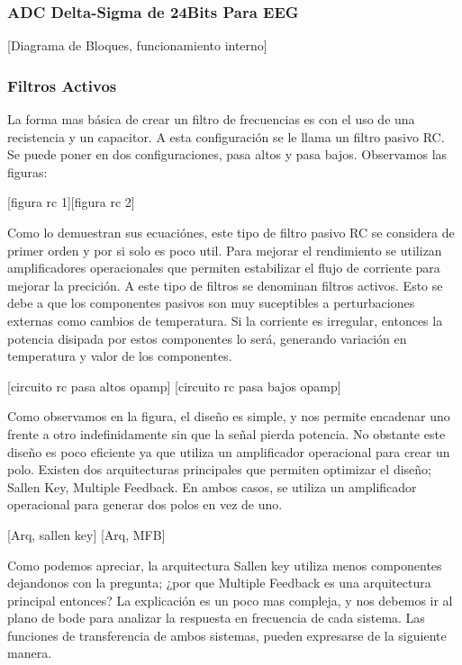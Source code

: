 \subsubsection{ADC Delta-Sigma de 24Bits Para EEG}
\label{sec:org4e3913a}

[Diagrama de Bloques, funcionamiento interno]

\subsubsection{Filtros Activos}
\label{sec:orge30535e}
La forma mas básica de crear un filtro de frecuencias es con el uso de una recistencia y un capacitor. A esta configuración se le llama un filtro pasivo RC. Se puede poner en dos configuraciones, pasa altos y pasa bajos. Observamos las figuras:

[figura rc 1][figura rc 2]

Como lo demuestran sus ecuaciónes, este tipo de filtro pasivo RC se considera de primer orden y por si solo es poco util. Para mejorar el rendimiento se utilizan amplificadores operacionales que permiten estabilizar el flujo de corriente para mejorar la precición. A este tipo de filtros se denominan filtros activos. Esto se debe a que los componentes pasivos son muy suceptibles a perturbaciones externas como cambios de temperatura. Si la corriente es irregular, entonces la potencia disipada por estos componentes lo será, generando variación en temperatura y valor de los componentes.

[circuito rc pasa altos opamp]
[circuito rc pasa bajos opamp]

Como observamos en la figura, el diseño es simple, y nos permite encadenar uno frente a otro indefinidamente sin que la señal pierda potencia. No obstante este diseño es poco eficiente ya que utiliza un amplificador operacional para crear un polo. Existen dos arquitecturas principales que permiten optimizar el diseño; Sallen Key, Multiple Feedback. En ambos casos, se utiliza un amplificador operacional para generar dos polos en vez de uno.

[Arq, sallen key] [Arq, MFB]

Como podemos apreciar, la arquitectura Sallen key utiliza menos componentes dejandonos con la pregunta; ¿por que Multiple Feedback es una arquitectura principal entonces? La explicación es un poco mas compleja, y nos debemos ir al plano de bode para analizar la respuesta en frecuencia de cada sistema. Las funciones de transferencia de ambos sistemas, pueden expresarse de la siguiente manera.

